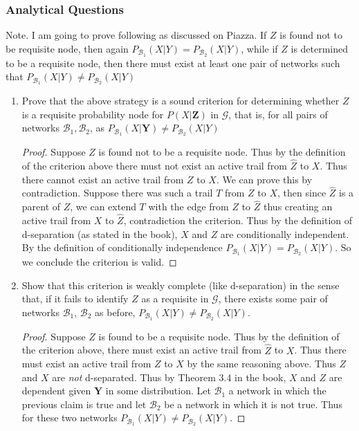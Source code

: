 \documentclass[12pt]{article}
\begin{document}
\subsubsection{Analytical Questions}
		Note. I am going to prove following as  discussed on Piazza. If $Z$ is found not to be requisite node, then again $P_{\mathcal{B}_1}(X|Y) = P_{\mathcal{B}_2}(X|Y)$, while if $Z$ is determined to be a requisite node, then there must exist at least one pair of networks such that $P_{\mathcal{B}_1}(X|Y) \not = P_{\mathcal{B}_2}(X|Y)$
\begin{enumerate}[1.]
	\item Prove that the above strategy is a sound criterion for determining whether $Z$ is a requisite probability node for $P(X|\mathbf{Z})$ in $\mathcal{G}$, that is, for all pairs of networks $\mathcal{B}_1,\mathcal{B}_2$, as $P_{\mathcal{B}_1}(X|\mathbf{Y}) \not = P_{\mathcal{B}_2}(X|Y)$ 
	\begin{proof}
	Suppose $Z$ is found not to be a requisite node. Thus by the definition of the criterion above there must not exist an active trail from $\hat{Z}$ to $X$. Thus there cannot exist an active trail from $Z$ to $X$. We can prove this by  contradiction. Suppose there was such a trail $T$ from $Z$ to $X$, then since $\hat{Z}$ is a parent of $Z$, we can extend $T$ with the edge from $Z$ to $\hat{Z}$ thus creating an active trail from $X$ to $\hat{Z}$, contradiction the criterion. Thus by the definition of d-separation (as stated in the book), $X$ and $Z$ are conditionally independent. By the definition of conditionally independence $P_{\mathcal{B}_1}(X|Y) = P_{\mathcal{B}_2}(X|Y)$. So we conclude the criterion is valid.
	\end{proof}
	\item 
	Show that this criterion is weakly complete (like d-separation) in the sense that,
if it fails to identify $Z$ as a requisite in $\mathcal{G}$, there exists some pair of networks $\mathcal{B}_1$, $\mathcal{B}_2$ as before, $P_{\mathcal{B}_1}(X|Y) \not = P_{\mathcal{B}_2}(X|Y)$.
\begin{proof}
	Suppose $Z$ is found to be a requisite node. Thus by the definition of the criterion above, there must exist an active trail from $\hat{Z}$ to $X$. Thus there must exist an active trail from $Z$ to $X$ by the same reasoning above. Thus $Z$ and $X$ are \textit{not} d-separated. Thus by Theorem 3.4 in the book, $X$ and $Z$ are dependent given $\mathbf{Y}$ in some distribution. Let $\mathcal{B}_1$ a network in which the previous claim is true and let $\mathcal{B}_2$ be a network in which it is not true. Thus for these two networks $P_{\mathcal{B}_1}(X|Y) \not = P_{\mathcal{B}_2}(X|Y)$.
	\end{proof}
\end{enumerate}
\end{document}
